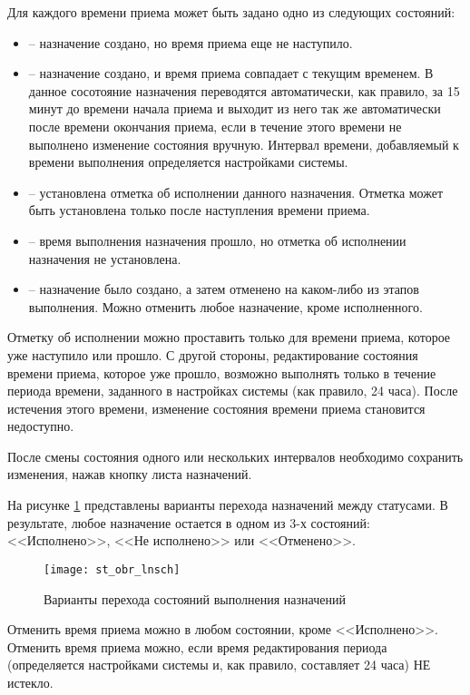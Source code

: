 Для каждого времени приема может быть задано одно из следующих состояний:
\begin{itemize}
 \item {} – назначение создано, но время приема еще не наступило.
 \item {} – назначение создано, и время приема совпадает с текущим временем. В данное сосотояние назначения переводятся автоматически, как правило, за 15 минут до времени начала приема и выходит из него так же автоматически после времени окончания приема, если в течение этого времени не выполнено изменение состояния вручную. Интервал времени, добавляемый к времени выполнения определяется настройками системы.
 \item {} – установлена отметка об исполнении данного назначения. Отметка может быть установлена только после наступления времени приема.
 \item {} – время выполнения назначения прошло, но отметка об исполнении назначения не установлена.
 \item {} – назначение было создано, а затем отменено на каком-либо из этапов выполнения. Можно отменить любое назначение, кроме исполненного.
\end{itemize}

Отметку об исполнении можно проставить только для времени приема, которое уже наступило или прошло. С другой стороны, редактирование состояния времени приема, которое уже прошло, возможно выполнять только в течение периода времени, заданного в настройках системы (как правило, 24 часа). После истечения этого времени, изменение состояния времени приема становится недоступно.

После смены состояния одного или нескольких интервалов необходимо сохранить изменения, нажав кнопку  листа назначений.

На рисунке \ref{img_st_obr_lnsch} представлены варианты перехода назначений между статусами. В результате, любое назначение остается в одном из 3-х состояний: <<Исполнено>>, <<Не исполнено>> или <<Отменено>>.

\begin{figure}[ht]\centering
   \texttt{[image: st\_obr\_lnsch]}
   \caption{Варианты перехода состояний выполнения назначений}
   \label{img_st_obr_lnsch}
\end{figure} 

Отменить время приема можно в любом состоянии, кроме <<Исполнено>>. Отменить время приема можно, если время редактирования периода (определяется настройками системы и, как правило, составляет 24 часа) НЕ истекло.

